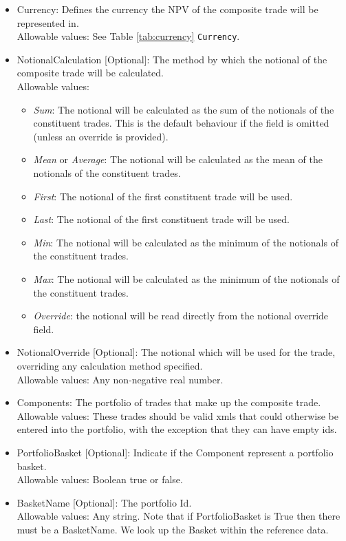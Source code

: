 \begin{itemize}
	\item Currency: Defines the currency the NPV of the composite trade will be represented in. \\
	  Allowable values:  See Table \ref{tab:currency} \lstinline!Currency!.
	\item NotionalCalculation [Optional]: The method by which the notional of the composite trade will be calculated. \\
	  Allowable values:
	  \begin{itemize}
	  	\item[] \emph{Sum}: The notional will be calculated as the sum of the notionals of the constituent trades. This is the default behaviour if the field is omitted (unless an override is provided).
	  	\item[] \emph{Mean} or \emph{Average}: The notional will be calculated as the mean of the notionals of the constituent trades.
	  	\item[] \emph{First}: The notional of the first constituent trade will be used.
	  	\item[] \emph{Last}: The notional of the first constituent trade will be used.
	  	\item[] \emph{Min}: The notional will be calculated as the minimum of the notionals of the constituent trades.
	  	\item[] \emph{Max}: The notional will be calculated as the minimum of the notionals of the constituent trades.
	  	\item[] \emph{Override}: the notional will be read directly from the notional override field.
	  \end{itemize}
	\item NotionalOverride [Optional]: The notional which will be used for the trade, overriding any calculation method specified. \\
      Allowable values: Any non-negative real number.
	\item Components: The portfolio of trades that make up the composite trade. \\
      Allowable values: These trades should be valid xmls that could otherwise be entered into the portfolio, with the exception that they can have empty ids.
    \item PortfolioBasket [Optional]: Indicate if the Component represent a portfolio basket. \\
    Allowable values: Boolean true or false.
    \item BasketName [Optional]: The portfolio Id. \\
    Allowable values: Any string. Note that if PortfolioBasket is True then there must be a BasketName. We look up the Basket within the reference data.
\end{itemize}
